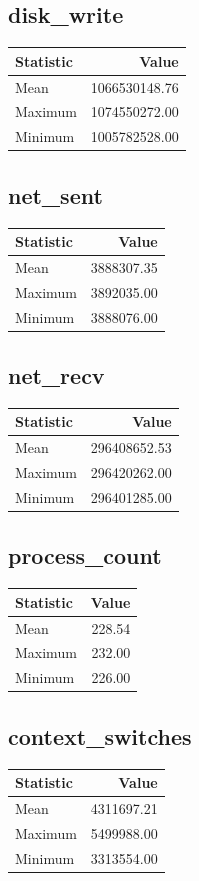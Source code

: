 \documentclass[11pt]{article}
\begin{document}
\subsection{disk_write}
\begin{tabular}{lr}
\toprule
Statistic & Value \\
\midrule
Mean & 1066530148.76 \\
Maximum & 1074550272.00 \\
Minimum & 1005782528.00 \\
\bottomrule
\end{tabular}


\subsection{net_sent}
\begin{tabular}{lr}
\toprule
Statistic & Value \\
\midrule
Mean & 3888307.35 \\
Maximum & 3892035.00 \\
Minimum & 3888076.00 \\
\bottomrule
\end{tabular}


\subsection{net_recv}
\begin{tabular}{lr}
\toprule
Statistic & Value \\
\midrule
Mean & 296408652.53 \\
Maximum & 296420262.00 \\
Minimum & 296401285.00 \\
\bottomrule
\end{tabular}


\subsection{process_count}
\begin{tabular}{lr}
\toprule
Statistic & Value \\
\midrule
Mean & 228.54 \\
Maximum & 232.00 \\
Minimum & 226.00 \\
\bottomrule
\end{tabular}


\subsection{context_switches}
\begin{tabular}{lr}
\toprule
Statistic & Value \\
\midrule
Mean & 4311697.21 \\
Maximum & 5499988.00 \\
Minimum & 3313554.00 \\
\bottomrule
\end{tabular}
\end{document}
